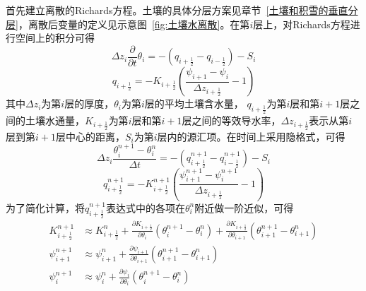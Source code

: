 首先建立离散的Richards方程。土壤的具体分层方案见章节~\ref{土壤和积雪的垂直分层}，离散后变量的定义见示意图~\ref{fig:土壤水离散}。在第$i$层上，对Richards方程进行空间上的积分可得
\begin{equation}
  \Delta z_{i} \frac{\partial}{\partial t} \theta_{i}=-\left(q_{i+\frac{1}{2}}-q_{i-\frac{1}{2}}\right)-S_{i}
\end{equation}
\begin{equation}
  q_{i+\frac{1}{2}}=-K_{i+\frac{1}{2}}\left(\frac{\psi_{i+1}-\psi_{i}}{\Delta z_{i+\frac{1}{2}}}-1\right)
\end{equation}
其中$\Delta {z_i}$为第$i$层的厚度，$\theta_i$为第$i$层的平均土壤含水量，
$q_{i+\frac{1}{2}}$为第$i$层和第$i+1$层之间的土壤水通量，$K_{i+\frac{1}{2}}$为第$i$层和第$i+1$层之间的等效导水率，$\Delta z_{i+\frac{1}{2}}$表示从第$i$层到第$i+1$层中心的距离，$S_i$为第$i$层内的源汇项。在时间上采用隐格式，可得
\begin{equation}
  \Delta z_{i} \frac{\theta_{i}^{n+1}-\theta_{i}^{n}}{\Delta t}=-\left(q_{i+\frac{1}{2}}^{n+1}-q_{i-\frac{1}{2}}^{n+1}\right)-S_{i}
\end{equation}
\begin{equation}
  q_{i+\frac{1}{2}}^{n+1}=-K_{i+\frac{1}{2}}^{n+1}\left(\frac{\psi_{i+1}^{n+1}-\psi_{i}^{n+1}}{\Delta z_{i+\frac{1}{2}}}-1\right)
\end{equation}
为了简化计算，将$q_{i+\frac{1}{2}}^{n+1}$表达式中的各项在$\theta_i^n$附近做一阶近似，可得
\begin{equation}
  \begin{aligned}
    K_{i+\frac{1}{2}}^{n+1} &\approx K_{i+\frac{1}{2}}^{n}+\frac{\partial K_{i+\frac{1}{2}}}
    {\partial \theta_{i}}\left(\theta_{i}^{n+1}-\theta_{i}^{n}\right)+\frac{\partial K_{i+\frac{1}{2}}}
    {\partial \theta_{i+1}}\left(\theta_{i+1}^{n+1}-\theta_{i+1}^{n}\right) \\
    \psi_{i+1}^{n+1} &\approx \psi_{i+1}^{n}+\frac{\partial \psi_{i+1}}{\partial \theta_{i+1}}\left(\theta_{i+1}^{n+1}-\theta_{i+1}^{n}\right) \\
    \psi_{i}^{n+1} &\approx \psi_{i}^{n}+\frac{\partial \psi_{i}}{\partial \theta_{i}}\left(\theta_{i}^{n+1}-\theta_{i}^{n}\right)
  \end{aligned}
\end{equation}

